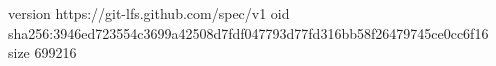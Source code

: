 version https://git-lfs.github.com/spec/v1
oid sha256:3946ed723554c3699a42508d7fdf047793d77fd316bb58f26479745ce0cc6f16
size 699216
